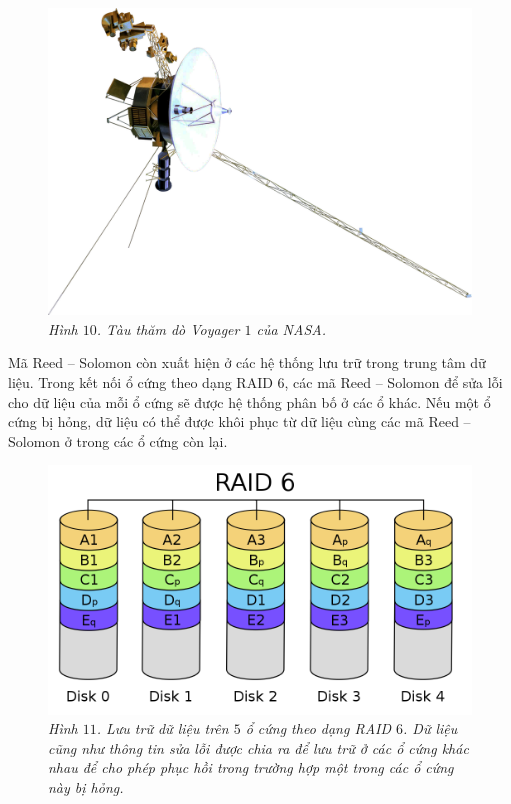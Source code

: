 \begin{multicols}{2}
\begin{figure}[H]
		\captionsetup{labelformat= empty, justification=centering}
		\includegraphics[width= 1\linewidth]{18}
		\caption{\small\textit{\color{toanhocdoisong}Hình $10$. Tàu thăm dò Voyager $1$ của NASA.}}
		\vspace*{-10pt}
	\end{figure}
	Mã Reed -- Solomon còn xuất hiện ở các hệ thống lưu trữ trong trung tâm dữ liệu. Trong kết nối ổ cứng theo dạng RAID $6$, các mã Reed -- Solomon để sửa lỗi cho dữ liệu của mỗi ổ cứng sẽ được hệ thống phân bố ở các ổ khác. Nếu một ổ cứng bị hỏng, dữ liệu có thể được khôi phục từ dữ liệu cùng các mã Reed -- Solomon ở trong các ổ cứng còn lại. 
	\begin{figure}[H]
		\vspace*{-5pt}
		\centering
		\captionsetup{labelformat= empty, justification=centering}
		\includegraphics[width= 1\linewidth]{19}
		\caption{\small\textit{\color{toanhocdoisong}Hình $11$. Lưu trữ dữ liệu trên $5$ ổ cứng theo dạng RAID $6$. Dữ liệu cũng như thông tin sửa lỗi được chia ra để lưu trữ ở các ổ cứng khác nhau để cho phép phục hồi trong trường hợp một trong các ổ cứng này bị hỏng.}}

\end{figure}
\end{multicols}
